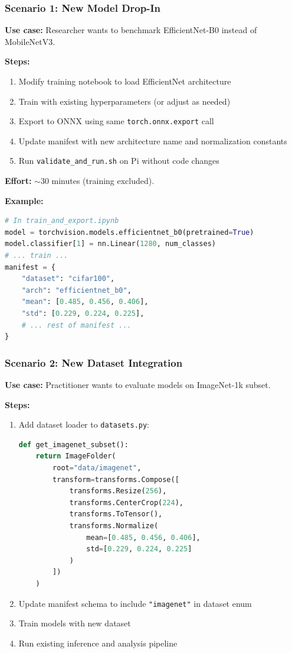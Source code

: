 \documentclass[review]{elsarticle}
\begin{document}
\subsubsection{Scenario 1: New Model Drop-In}

\textbf{Use case:} Researcher wants to benchmark EfficientNet-B0 instead of MobileNetV3.

\textbf{Steps:}

\begin{enumerate}
\item Modify training notebook to load EfficientNet architecture
\item Train with existing hyperparameters (or adjust as needed)
\item Export to ONNX using same \texttt{torch.onnx.export} call
\item Update manifest with new architecture name and normalization constants
\item Run \texttt{validate\_and\_run.sh} on Pi without code changes
\end{enumerate}

\textbf{Effort:} $\sim$30 minutes (training excluded).

\textbf{Example:}

\begin{lstlisting}[language=Python]
# In train_and_export.ipynb
model = torchvision.models.efficientnet_b0(pretrained=True)
model.classifier[1] = nn.Linear(1280, num_classes)
# ... train ...
manifest = {
    "dataset": "cifar100",
    "arch": "efficientnet_b0",
    "mean": [0.485, 0.456, 0.406],
    "std": [0.229, 0.224, 0.225],
    # ... rest of manifest ...
}
\end{lstlisting}

\subsubsection{Scenario 2: New Dataset Integration}

\textbf{Use case:} Practitioner wants to evaluate models on ImageNet-1k subset.

\textbf{Steps:}

\begin{enumerate}
\item Add dataset loader to \texttt{datasets.py}:
\begin{lstlisting}[language=Python]
def get_imagenet_subset():
    return ImageFolder(
        root="data/imagenet",
        transform=transforms.Compose([
            transforms.Resize(256),
            transforms.CenterCrop(224),
            transforms.ToTensor(),
            transforms.Normalize(
                mean=[0.485, 0.456, 0.406],
                std=[0.229, 0.224, 0.225]
            )
        ])
    )
\end{lstlisting}
\item Update manifest schema to include \texttt{"imagenet"} in dataset enum
\item Train models with new dataset
\item Run existing inference and analysis pipeline
\end{enumerate}
\end{document}
